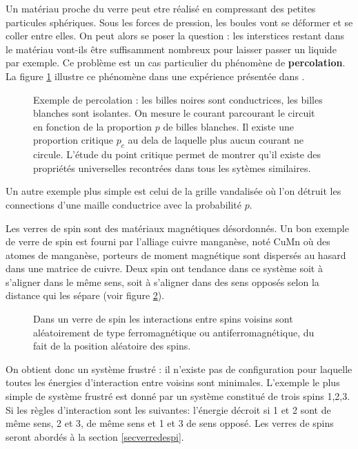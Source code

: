 \documentclass[12pt]{book}
\begin{document}
Un mat\'eriau proche du verre peut etre r\'ealis\'e en compressant des
petites particules sph\'eriques. Sous les forces de pression, les
boules vont se d\'eformer et se coller entre elles. On peut alors se
poser la question : les interstices restant dans le mat\'eriau
vont-ils \^etre suffisamment nombreux pour laisser passer un liquide
par exemple. Ce probl\`eme est un cas particulier du ph\'enom\`ene de
{\bf percolation}\cite{ph:mater:Zallen83}. La figure \ref{figpercol}
illustre ce ph\'enom\`ene dans une exp\'erience pr\'esent\'ee dans  \cite{ph:mater:Zallen83}.
\begin{figure}[htb]
 \centerline{}   
 \caption{Exemple de percolation : les billes noires sont
conductrices, les billes blanches sont isolantes. On mesure le courant
parcourant le circuit en fonction de la proportion $p$ de billes
blanches. Il existe une proportion critique $p_c$ au dela de laquelle
plus aucun courant ne circule. L'\'etude du point critique permet de
montrer qu'il existe des propri\'et\'es universelles recontr\'ees dans
tous les syt\`emes similaires.} 
 \label{figpercol}
\end{figure}
Un autre exemple plus simple est celui de la grille
vandalis\'ee\cite{ph:mater:Zallen83} o\`u 
l'on d\'etruit les connections d'une maille conductrice avec la
probabilit\'e $p$.

Les verres de spin sont des mat\'eriaux magn\'etiques d\'esordonn\'es.
Un bon exemple de verre de spin est fourni par l'alliage cuivre
mangan\`ese, not\'e CuMn o\`u des atomes de mangan\`ese, porteurs de
moment magn\'etique sont dispers\'es au hasard dans une matrice de
cuivre. Deux spin ont tendance dans ce syst\`eme soit \`a s'aligner
dans le m\^eme sens, soit \`a s'aligner dans des sens oppos\'es selon
la distance qui les s\'epare (voir figure \ref{figspinglass}).
\begin{figure}[htb]
 \centerline{}   
 \caption{Dans un verre de spin les interactions entre spins voisins
sont al\'eatoirement de type ferromagn\'etique ou
antiferromagn\'etique, du fait de la position al\'eatoire des spins.}
 \label{figspinglass}
\end{figure}
On obtient donc un syst\`eme frustr\'e : il n'existe pas de
configuration pour laquelle toutes les \'energies d'interaction entre
voisins sont minimales. L'exemple le plus simple de syst\`eme
frustr\'e est donn\'e par un syst\`eme constitu\'e de trois spins
1,2,3. Si les r\`egles d'interaction sont les suivantes: l'\'energie
d\'ecroit si 1 et 2 sont de m\^eme sens, 2 et 3, de m\^eme sens et 1
et 3 de sens oppos\'e. Les verres de spins seront abord\'es \`a la section
\ref{secverredespi}.
\end{document}
